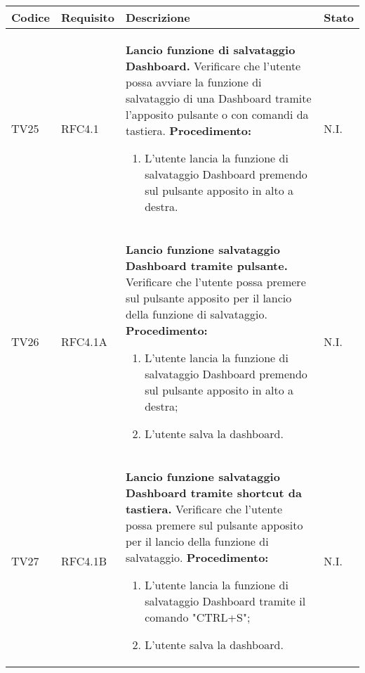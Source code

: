 \begin{table}[!htpb]
	\centering
	\renewcommand{\arraystretch}{2} 
	\begin{tabular}{|l|l|p{10cm}|l|}
		\rowcolor{orange!50}
		\hline
		\textbf{Codice} & \textbf{Requisito}& \textbf{Descrizione} & \textbf{Stato}\\ 
		\hline
		TV25 & RFC4.1 &
			\textbf{Lancio funzione di salvataggio Dashboard.}
			\newline
			Verificare che l'utente possa avviare la funzione di salvataggio di una Dashboard tramite l’apposito pulsante o con comandi da tastiera.
			\newline
			\textbf{Procedimento:}
			\begin{enumerate}
				\item L’utente lancia la funzione di salvataggio Dashboard premendo sul pulsante apposito in alto a destra.
			\end{enumerate} 
			& N.I.\\
		\hline
		TV26 & RFC4.1A &
			\textbf{Lancio funzione salvataggio Dashboard tramite pulsante.}
			\newline
			Verificare che l'utente possa premere sul pulsante apposito per il lancio della funzione di salvataggio.
			\newline
			\textbf{Procedimento:}
			\begin{enumerate}
				\item L’utente lancia la funzione di salvataggio Dashboard premendo sul pulsante apposito in alto a destra;
				\item L'utente salva la dashboard.
			\end{enumerate} 
			& N.I.\\
		\hline
		TV27 & RFC4.1B &
			\textbf{Lancio funzione salvataggio Dashboard tramite shortcut da tastiera.}
			\newline
			Verificare che l'utente possa premere sul pulsante apposito per il lancio della funzione di salvataggio.
			\newline
			\textbf{Procedimento:}
			\begin{enumerate}
				\item L’utente lancia la funzione di salvataggio Dashboard tramite il comando "CTRL+S";
				\item L'utente salva la dashboard.
			\end{enumerate} 
			& N.I.\\
		\hline
	\end{tabular}
\end{table}
